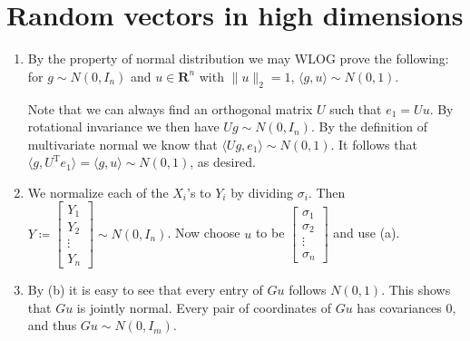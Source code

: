 \documentclass[11pt]{article}
\newcommand{\R}{\mathbf{R}}
\newcommand{\inp}[2]{\langle #1, #2 \rangle}
\newcommand{\nm}[1]{\lVert #1 \rVert}
\newcommand{\trp}{\mathrm T}
\theoremstyle{plain}
\theoremstyle{definition}
\theoremstyle{remark}
\theoremstyle{definition}
\newenvironment{mansol}[1]{%
  \renewcommand\themansolinner{#1}%
  \mansolinner
}{\endmansolinner}
\begin{document}
\newpage
\section{Random vectors in high dimensions}
\begin{mansol}{3.3.3}
    \begin{enumerate}[label=(\alph*)]
        \item By the property of normal distribution we may WLOG prove the following: for $g \sim N(0,I_n)$ and $u \in \R^n$ with $\nm{u}_2 = 1$, $\inp{g}{u}\sim N(0,1)$.
        
        Note that we can always find an orthogonal matrix $U$ such that $e_1 = Uu$. By rotational invariance we then have $Ug \sim N(0,I_n)$. By the definition of multivariate normal we know that $\inp{Ug}{e_1} \sim N(0,1)$. It follows that $\inp{g}{U^\trp e_1} = \inp{g}{u} \sim N(0,1)$, as desired.
        \item We normalize each of the $X_i$'s to $Y_i$ by dividing $\sigma_i$. Then $Y \coloneqq 
        \begin{bmatrix}
            Y_1 \\ Y_2 \\ \vdots \\ Y_n
        \end{bmatrix} \sim N(0,I_n)$. Now choose $u$ to be $\begin{bmatrix}
            \sigma_1 \\ \sigma_2 \\ \vdots \\ \sigma_n
        \end{bmatrix}$ and use (a).
        \item By (b) it is easy to see that every entry of $Gu$ follows $N(0,1)$. This shows that $Gu$ is jointly normal. Every pair of coordinates of $Gu$ has covariances 0, and thus $Gu \sim N(0,I_m)$.
    \end{enumerate}
\end{mansol}
\end{document}
